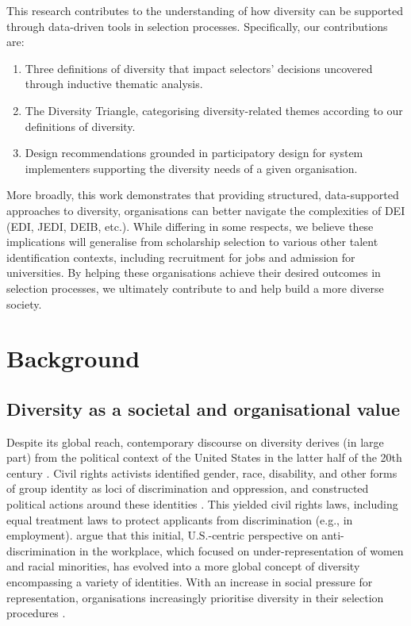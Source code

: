 This research contributes to the understanding of how diversity can be supported through data-driven tools in selection processes. Specifically, our contributions are:

\begin{enumerate}
    \item Three definitions of diversity that impact selectors' decisions uncovered through inductive thematic analysis.
    \item The Diversity Triangle, categorising diversity-related themes according to our definitions of diversity.
    \item Design recommendations grounded in participatory design for system implementers supporting the diversity needs of a given organisation.
\end{enumerate}

\noindent More broadly, this work demonstrates that providing structured, data-supported approaches to diversity, organisations can better navigate the complexities of DEI (EDI, JEDI, DEIB, etc.). While differing in some respects, we believe these implications will generalise from scholarship selection to various other talent identification contexts, including recruitment for jobs and admission for universities. By helping these organisations achieve their desired outcomes in selection processes, we ultimately contribute to and help build a more diverse society.

\section{Background}\label{sec:back}
\subsection{Diversity as a societal and organisational value}\label{ssec:value}
Despite its global reach, contemporary discourse on diversity derives (in large part) from the political context of the United States in the latter half of the 20th century \cite{nkomo2019diversity}. Civil rights activists identified gender, race, disability, and other forms of group identity as loci of discrimination and oppression, and constructed political actions around these identities \cite{morris1984origins}. This yielded civil rights laws, including equal treatment laws to protect applicants from discrimination (e.g., in employment). \textcite{nkomo2019diversity} argue that this initial, U.S.-centric perspective on anti-discrimination in the workplace, which focused on under-representation of women and racial minorities, has evolved into a more global concept of diversity encompassing a variety of identities. With an increase in social pressure for representation, organisations increasingly prioritise diversity in their selection procedures \cite{hsieh2019allocation,minkin2023diversity}.


